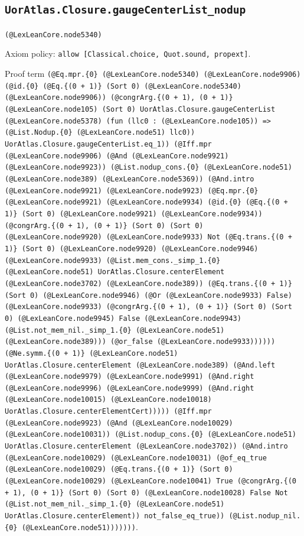 \documentclass[11pt]{article}
\begin{document}
\subsection*{\texttt{UorAtlas.Closure.gaugeCenterList\_nodup}}
\noindent\texttt{(@LexLeanCore.node5340)}\par
\noindent Axiom policy: \texttt{allow [Classical.choice, Quot.sound, propext]}.\par
\noindent Proof term \texttt{(@Eq.mpr.\{0\} (@LexLeanCore.node5340) (@LexLeanCore.node9906) (@id.\{0\} (@Eq.\{(0 + 1)\} (Sort 0) (@LexLeanCore.node5340) (@LexLeanCore.node9906)) (@congrArg.\{(0 + 1), (0 + 1)\} (@LexLeanCore.node105) (Sort 0) UorAtlas.Closure.gaugeCenterList (@LexLeanCore.node5378) (fun (llc0 : (@LexLeanCore.node105)) => (@List.Nodup.\{0\} (@LexLeanCore.node51) llc0)) UorAtlas.Closure.gaugeCenterList.eq\_1)) (@Iff.mpr (@LexLeanCore.node9906) (@And (@LexLeanCore.node9921) (@LexLeanCore.node9923)) (@List.nodup\_cons.\{0\} (@LexLeanCore.node51) (@LexLeanCore.node389) (@LexLeanCore.node5369)) (@And.intro (@LexLeanCore.node9921) (@LexLeanCore.node9923) (@Eq.mpr.\{0\} (@LexLeanCore.node9921) (@LexLeanCore.node9934) (@id.\{0\} (@Eq.\{(0 + 1)\} (Sort 0) (@LexLeanCore.node9921) (@LexLeanCore.node9934)) (@congrArg.\{(0 + 1), (0 + 1)\} (Sort 0) (Sort 0) (@LexLeanCore.node9920) (@LexLeanCore.node9933) Not (@Eq.trans.\{(0 + 1)\} (Sort 0) (@LexLeanCore.node9920) (@LexLeanCore.node9946) (@LexLeanCore.node9933) (@List.mem\_cons.\_simp\_1.\{0\} (@LexLeanCore.node51) UorAtlas.Closure.centerElement (@LexLeanCore.node3702) (@LexLeanCore.node389)) (@Eq.trans.\{(0 + 1)\} (Sort 0) (@LexLeanCore.node9946) (@Or (@LexLeanCore.node9933) False) (@LexLeanCore.node9933) (@congrArg.\{(0 + 1), (0 + 1)\} (Sort 0) (Sort 0) (@LexLeanCore.node9945) False (@LexLeanCore.node9943) (@List.not\_mem\_nil.\_simp\_1.\{0\} (@LexLeanCore.node51) (@LexLeanCore.node389))) (@or\_false (@LexLeanCore.node9933)))))) (@Ne.symm.\{(0 + 1)\} (@LexLeanCore.node51) UorAtlas.Closure.centerElement (@LexLeanCore.node389) (@And.left (@LexLeanCore.node9979) (@LexLeanCore.node9991) (@And.right (@LexLeanCore.node9996) (@LexLeanCore.node9999) (@And.right (@LexLeanCore.node10015) (@LexLeanCore.node10018) UorAtlas.Closure.centerElementCert))))) (@Iff.mpr (@LexLeanCore.node9923) (@And (@LexLeanCore.node10029) (@LexLeanCore.node10031)) (@List.nodup\_cons.\{0\} (@LexLeanCore.node51) UorAtlas.Closure.centerElement (@LexLeanCore.node3702)) (@And.intro (@LexLeanCore.node10029) (@LexLeanCore.node10031) (@of\_eq\_true (@LexLeanCore.node10029) (@Eq.trans.\{(0 + 1)\} (Sort 0) (@LexLeanCore.node10029) (@LexLeanCore.node10041) True (@congrArg.\{(0 + 1), (0 + 1)\} (Sort 0) (Sort 0) (@LexLeanCore.node10028) False Not (@List.not\_mem\_nil.\_simp\_1.\{0\} (@LexLeanCore.node51) UorAtlas.Closure.centerElement)) not\_false\_eq\_true)) (@List.nodup\_nil.\{0\} (@LexLeanCore.node51)))))))}.\par
\end{document}
